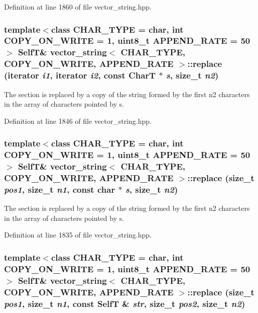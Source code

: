 Definition at line 1860 of file vector\_\-string.hpp.\hypertarget{classvector__string_02f74c9a49dca62cf406f8d4333b5b26}{
\subsubsection[{replace}]{\setlength{\rightskip}{0pt plus 5cm}template$<$class CHAR\_\-TYPE  = char, int COPY\_\-ON\_\-WRITE = 1, uint8\_\-t APPEND\_\-RATE = 50$>$ {\bf SelfT}\& {\bf vector\_\-string}$<$ CHAR\_\-TYPE, COPY\_\-ON\_\-WRITE, APPEND\_\-RATE $>$::replace (iterator {\em i1}, \/  iterator {\em i2}, \/  const CharT $\ast$ {\em s}, \/  size\_\-t {\em n2})}}
\label{classvector__string_02f74c9a49dca62cf406f8d4333b5b26}


The section is replaced by a copy of the string formed by the first n2 characters in the array of characters pointed by s. 

Definition at line 1846 of file vector\_\-string.hpp.\hypertarget{classvector__string_75a0a425571b008d49608cbaeaa009bd}{
\subsubsection[{replace}]{\setlength{\rightskip}{0pt plus 5cm}template$<$class CHAR\_\-TYPE  = char, int COPY\_\-ON\_\-WRITE = 1, uint8\_\-t APPEND\_\-RATE = 50$>$ {\bf SelfT}\& {\bf vector\_\-string}$<$ CHAR\_\-TYPE, COPY\_\-ON\_\-WRITE, APPEND\_\-RATE $>$::replace (size\_\-t {\em pos1}, \/  size\_\-t {\em n1}, \/  const char $\ast$ {\em s}, \/  size\_\-t {\em n2})}}
\label{classvector__string_75a0a425571b008d49608cbaeaa009bd}


The section is replaced by a copy of the string formed by the first n2 characters in the array of characters pointed by s. 

Definition at line 1835 of file vector\_\-string.hpp.\hypertarget{classvector__string_7721190d3b203c2debdde8decc8b4805}{
\subsubsection[{replace}]{\setlength{\rightskip}{0pt plus 5cm}template$<$class CHAR\_\-TYPE  = char, int COPY\_\-ON\_\-WRITE = 1, uint8\_\-t APPEND\_\-RATE = 50$>$ {\bf SelfT}\& {\bf vector\_\-string}$<$ CHAR\_\-TYPE, COPY\_\-ON\_\-WRITE, APPEND\_\-RATE $>$::replace (size\_\-t {\em pos1}, \/  size\_\-t {\em n1}, \/  const {\bf SelfT} \& {\em str}, \/  size\_\-t {\em pos2}, \/  size\_\-t {\em n2})}}
\label{classvector__string_7721190d3b203c2debdde8decc8b4805}



